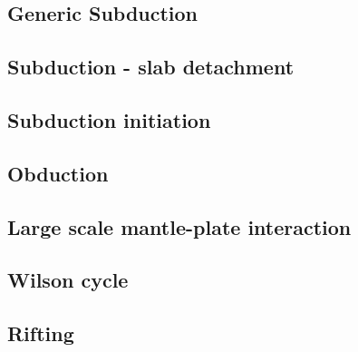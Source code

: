 \subsection*{Generic Subduction}

\cite{artd07}
\cite{ozrs08}
\cite{anwb12}
\cite{nabg13}
\cite{ancv13}
\cite{namu13}

\subsection*{Subduction - slab detachment}

\cite{anbi09}

\subsection*{Subduction initiation}

\cite{nigm10}

\subsection*{Obduction}

\cite{agzf14}

\subsection*{Large scale mantle-plate interaction}

\cite{algs12}

\subsection*{Wilson cycle}

\subsection*{Rifting}

\cite{agcz09}
\cite{aubh10}
\cite{alht11}
\cite{alht12}
\cite{alhf12}
\cite{nabu15}
\cite{olbm16}

